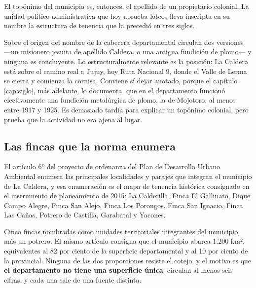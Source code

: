 El topónimo del municipio es, entonces, el apellido de un propietario colonial. La unidad
político-administrativa que hoy aprueba loteos lleva inscripta en su nombre la estructura
de tenencia que la precedió en tres siglos.

Sobre el origen del nombre de la cabecera departamental circulan dos versiones —un
misionero jesuita de apellido Caldera, o una antigua fundición de plomo— y ninguna es
concluyente. Lo estructuralmente relevante es la posición: La Caldera está sobre el camino
real a Jujuy, hoy Ruta Nacional 9, donde el Valle de Lerma se cierra y comienza la
cornisa. Conviene sí dejar anotado, porque el capítulo \ref{cap:siglo}, más adelante, lo documenta, que en el
departamento funcionó efectivamente una fundición metalúrgica de plomo, la de Mojotoro,
al menos entre 1917 y 1925. Es demasiado tardía para explicar un topónimo colonial, pero
prueba que la actividad no era ajena al lugar.

\subsection*{Las fincas que la norma enumera}

El artículo 6º del proyecto de ordenanza del Plan de Desarrollo Urbano Ambiental enumera
las principales localidades y parajes que integran el municipio de La Caldera, y esa
enumeración es el mapa de tenencia histórica consignado en el instrumento de planeamiento de
2015: La
Calderilla, Finca El Gallinato, Dique Campo Alegre, Finca San Alejo, Finca Los Porongos,
Finca San Ignacio, Finca Las Cañas, Potrero de Castilla, Garabatal y Yacones.

Cinco fincas nombradas como unidades territoriales integrantes del municipio, más un
potrero. El mismo artículo consigna que el municipio abarca 1.200 km², equivalentes al 82
por ciento de la superficie departamental y al 10 por ciento de la provincial. Ninguna de las dos proporciones resiste el cotejo, y el motivo es que \textbf{el departamento no tiene una superficie única}: circulan al menos seis cifras, y cada una sale de una fuente distinta.

